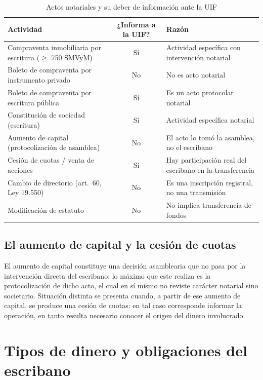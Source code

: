 \documentclass[12pt,oneside]{book}
\begin{document}
\begin{table}[H]
\centering
\caption{Actos notariales y su deber de información ante la UIF}
\begin{tabularx}{\textwidth}{>{\raggedright\arraybackslash}X c >{\raggedright\arraybackslash}X}
\toprule
\textbf{Actividad} & \textbf{¿Informa a la UIF?} & \textbf{Razón} \\
\midrule
Compraventa inmobiliaria por escritura ($\geq$ 750 SMVyM) & Sí & Actividad específica con intervención notarial \\
Boleto de compraventa por instrumento privado & No & No es acto notarial \\
Boleto de compraventa por escritura pública & Sí & Es un acto protocolar notarial \\
Constitución de sociedad (escritura) & Sí & Actividad específica notarial \\
Aumento de capital (protocolización de asamblea) & No & El acto lo tomó la asamblea, no el escribano \\
Cesión de cuotas / venta de acciones & Sí & Hay participación real del escribano en la transferencia \\
Cambio de directorio (art.\ 60, Ley 19.550) & No & Es una inscripción registral, no una transmisión \\
Modificación de estatuto & No & No implica transferencia de fondos \\
\bottomrule
\end{tabularx}
\end{table}

\subsection{El aumento de capital y la cesión de cuotas}

El aumento de capital constituye una decisión asamblearia que no pasa por la intervención directa del escribano; lo máximo que este realiza es la protocolización de dicho acto, el cual en sí mismo no reviste carácter notarial sino societario. Situación distinta se presenta cuando, a partir de ese aumento de capital, se produce una cesión de cuotas: en tal caso corresponde informar la operación, en tanto resulta necesario conocer el origen del dinero involucrado.

\section{Tipos de dinero y obligaciones del escribano}
\end{document}
